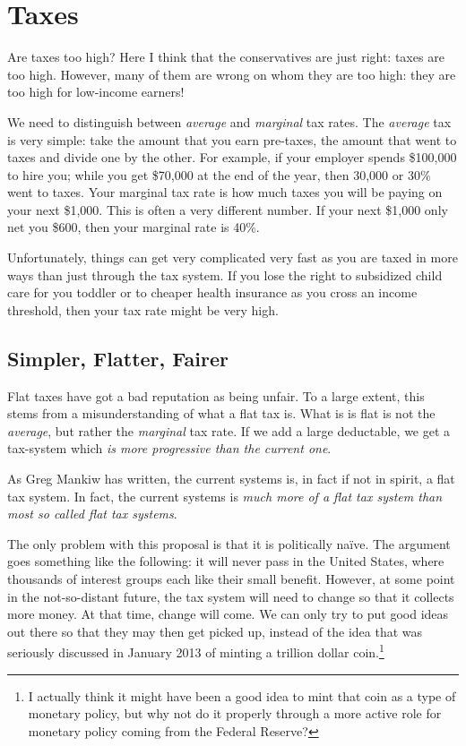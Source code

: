 \chapter{Taxes}%
\label{chpt:taxes}

Are taxes too high? Here I think that the conservatives are just right: taxes
are too high. However, many of them are wrong on whom they are too high: they
are too high for low-income earners!

We need to distinguish between \emph{average} and \emph{marginal} tax rates.
The \emph{average} tax is very simple: take the amount that you earn pre-taxes,
the amount that went to taxes and divide one by the other. For example, if your
employer spends \$100,000 to hire you; while you get \$70,000 at the end of the
year, then 30,000 or 30\% went to taxes. Your marginal tax rate is how much
taxes you will be paying on your next \$1,000. This is often a very different
number. If your next \$1,000 only net you \$600, then your marginal rate is
40\%. %

Unfortunately, things can get very complicated very fast as you are taxed in
more ways than just through the tax system. If you lose the right to subsidized
child care for you toddler or to cheaper health insurance as you cross an
income threshold, then your tax rate might be very high.

\section{Simpler, Flatter, Fairer}

Flat taxes have got a bad reputation as being unfair. To a large extent, this
stems from a misunderstanding of what a flat tax is. What is is flat is not the
\emph{average}, but rather the \emph{marginal} tax rate. If we add a large
deductable, we get a tax-system which \emph{is more progressive than the
current one}.

As Greg Mankiw has written, the current systems is, in fact if not in spirit, a
flat tax system. In fact, the current systems is \emph{much more of a flat tax
system than most so called flat tax systems}.

The only problem with this proposal is that it is politically naïve. The
argument goes something like the following: it will never pass in the United
States, where thousands of interest groups each like their small benefit.
However, at some point in the not-so-distant future, the tax system will need
to change so that it collects more money. At that time, change will come. We
can only try to put good ideas out there so that they may then get picked up,
instead of the idea that was seriously discussed in January 2013 of minting a
trillion dollar coin.\footnote{I actually think it might have been a good idea
to mint that coin as a type of monetary policy, but why not do it properly
through a more active role for monetary policy coming from the Federal
Reserve?}

